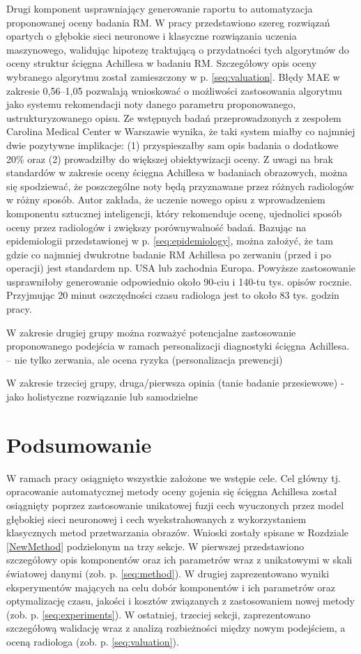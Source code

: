 Drugi komponent usprawniający generowanie raportu to automatyzacja proponowanej oceny badania RM. W pracy przedstawiono szereg rozwiązań opartych o głębokie sieci neuronowe i klasyczne rozwiązania uczenia maszynowego, walidując hipotezę traktującą o przydatności tych algorytmów do oceny struktur ścięgna Achillesa w badaniu RM. Szczegółowy opis oceny wybranego algorytmu został zamieszczony w p. \ref{seq:valuation}. Błędy MAE w zakresie 0,56--1,05 pozwalają wnioskować o możliwości zastosowania algorytmu jako systemu rekomendacji noty danego parametru proponowanego, ustrukturyzowanego opisu. Ze wstępnych badań przeprowadzonych z zespołem Carolina Medical Center w Warszawie wynika, że taki system miałby co najmniej dwie pozytywne implikacje: (1) przyspieszałby sam opis badania o dodatkowe 20\% oraz (2) prowadziłby do większej obiektywizacji oceny. Z uwagi na brak standardów w zakresie oceny ścięgna Achillesa w badaniach obrazowych, można się spodziewać, że poszczególne noty będą przyznawane przez różnych radiologów w różny sposób. Autor zakłada, że uczenie nowego opisu z wprowadzeniem komponentu sztucznej inteligencji, który rekomenduje ocenę, ujednolici sposób oceny przez radiologów i zwiększy porównywalność badań. Bazując na epidemiologii przedstawionej w p. \ref{seq:epidemiology}, można założyć, że tam gdzie co najmniej dwukrotne badanie RM Achillesa po zerwaniu (przed i po operacji) jest standardem np. USA lub zachodnia Europa. Powyższe zastosowanie usprawniłoby generowanie odpowiednio około 90-ciu i 140-tu tys. opisów rocznie. Przyjmując 20 minut oszczędności czasu radiologa jest to około 83 tys. godzin pracy.

W zakresie drugiej grupy można rozważyć potencjalne zastosowanie proponowanego podejścia w ramach personalizacji diagnostyki ścięgna Achillesa.
-- nie tylko zerwania, ale ocena ryzyka (personalizacja prewencji)

W zakresie trzeciej grupy, druga/pierwsza opinia (tanie badanie przesiewowe) - jako holistyczne rozwiązanie lub samodzielne   

\chapter{Podsumowanie}

W ramach pracy osiągnięto wszystkie założone we wstępie cele. Cel główny tj. opracowanie automatycznej metody oceny gojenia się ścięgna Achillesa został osiągnięty poprzez zastosowanie unikatowej fuzji cech wyuczonych przez model głębokiej sieci neuronowej i cech wyekstrahowanych z wykorzystaniem klasycznych metod przetwarzania obrazów. Wnioski zostały spisane w Rozdziale \ref{NewMethod} podzielonym na trzy sekcje. W pierwszej przedstawiono szczegółowy opis komponentów oraz ich parametrów wraz z unikatowymi w skali światowej danymi (zob. p. \ref{seq:method}). W drugiej zaprezentowano wyniki eksperymentów mających na celu dobór komponentów i ich parametrów oraz optymalizację czasu, jakości i kosztów związanych z zastosowaniem nowej metody (zob. p. \ref{seq:experiments}). W ostatniej, trzeciej sekcji, zaprezentowano szczegółową walidację wraz z analizą rozbieżności między nowym podejściem, a oceną radiologa (zob. p. \ref{seq:valuation}).

